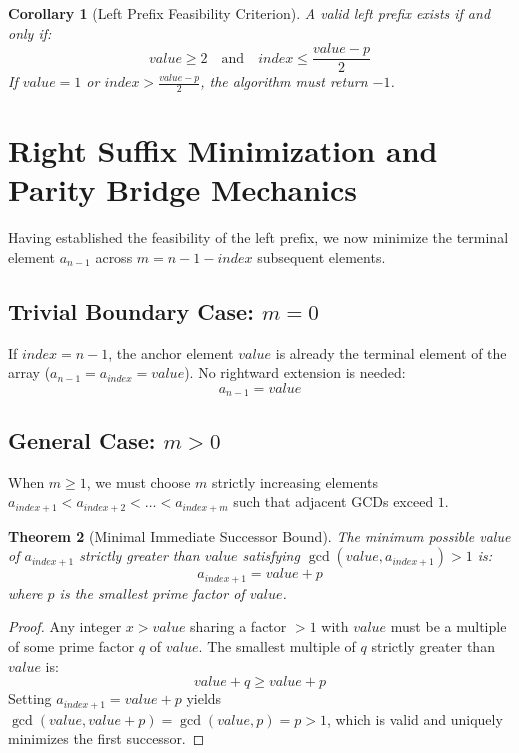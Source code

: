 \documentclass[10pt,journal,compsoc,onecolumn]{IEEEtran}
\newtheorem{theorem}{Theorem}
\newtheorem{corollary}[theorem]{Corollary}
\begin{document}
\begin{corollary}[Left Prefix Feasibility Criterion]
A valid left prefix exists if and only if:
\begin{equation}
value \ge 2 \quad \text{and} \quad index \le \frac{value - p}{2}
\end{equation}
If $value = 1$ or $index > \frac{value - p}{2}$, the algorithm must return $-1$.
\end{corollary}

\section{Right Suffix Minimization and Parity Bridge Mechanics}
\label{sec:right_suffix}

Having established the feasibility of the left prefix, we now minimize the terminal element $a_{n-1}$ across $m = n - 1 - index$ subsequent elements.

\subsection{Trivial Boundary Case: $m = 0$}
If $index = n - 1$, the anchor element $value$ is already the terminal element of the array ($a_{n-1} = a_{index} = value$). No rightward extension is needed:
\begin{equation}
a_{n-1} = value
\end{equation}

\subsection{General Case: $m > 0$}
When $m \ge 1$, we must choose $m$ strictly increasing elements $a_{index+1} < a_{index+2} < \dots < a_{index+m}$ such that adjacent GCDs exceed $1$.

\begin{theorem}[Minimal Immediate Successor Bound]
\label{thm:min_successor}
The minimum possible value of $a_{index+1}$ strictly greater than $value$ satisfying $\gcd(value, a_{index+1}) > 1$ is:
\begin{equation}
a_{index+1} = value + p
\end{equation}
where $p$ is the smallest prime factor of $value$.
\end{theorem}
\begin{proof}
Any integer $x > value$ sharing a factor $> 1$ with $value$ must be a multiple of some prime factor $q$ of $value$. The smallest multiple of $q$ strictly greater than $value$ is:
\begin{equation}
value + q \ge value + p
\end{equation}
Setting $a_{index+1} = value + p$ yields $\gcd(value, value + p) = \gcd(value, p) = p > 1$, which is valid and uniquely minimizes the first successor.
\end{proof}
\end{document}
